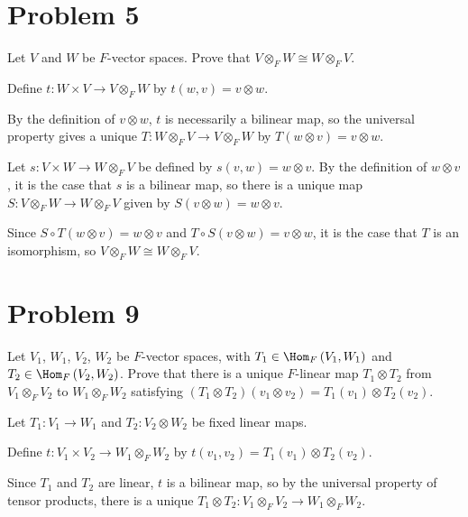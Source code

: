 \documentclass[10pt]{mypackage}
\begin{document}
\section{Problem 5}%
\begin{problem}
  Let $V$ and $W$ be $F$-vector spaces. Prove that $V\otimes_{F} W \cong W\otimes_{F} V$.
\end{problem}
\begin{solution}
  Define $t: W\times V \rightarrow V\otimes_{F} W$ by $t\left(w,v\right) = v\otimes w$.\newline

  By the definition of $v\otimes w$, $t$ is necessarily a bilinear map, so the universal property gives a unique $T: W\otimes_{F}V\rightarrow V\otimes_{F}W$ by $T\left(w\otimes v\right) = v\otimes w$.\newline

  Let $s: V\times W \rightarrow W\otimes_{F} V$ be defined by $s\left(v,w\right) = w\otimes v$. By the definition of $w\otimes v$, it is the case that $s$ is a bilinear map, so there is a unique map $S: V\otimes_{F} W \rightarrow W\otimes_{F} V$ given by $S\left(v\otimes w\right) = w\otimes v$.\newline

  Since $S\circ T\left(w\otimes v\right) = w\otimes v$ and $T\circ S\left(v\otimes w\right) = v\otimes w$, it is the case that $T$ is an isomorphism, so $V\otimes_{F} W \cong W\otimes_{F} V$.
\end{solution}
\section{Problem 9}%
\begin{problem}
  Let $V_1$, $W_1$, $V_2$, $W_2$ be $F$-vector spaces, with $T_1\in \Hom_{F}\left(V_1,W_1\right)$ and $T_2 \in \Hom_{F}\left(V_2,W_2\right)$. Prove that there is a unique $F$-linear map $T_1\otimes T_2$ from $V_1\otimes_{F}V_2$ to $W_1\otimes_{F}W_2$ satisfying $\left(T_1\otimes T_2\right)\left(v_1\otimes v_2\right) = T_1\left(v_1\right)\otimes T_2\left(v_2\right)$.
\end{problem}
\begin{solution}
  Let $T_1: V_1\rightarrow W_1$ and $T_2: V_2\otimes W_2$ be fixed linear maps.\newline

  Define $t: V_1\times V_2\rightarrow W_1\otimes_{F} W_2$ by $t\left(v_1,v_2\right) = T_1\left(v_1\right)\otimes T_2\left(v_2\right)$.\newline

  Since $T_1$ and $T_2$ are linear, $t$ is a bilinear map, so by the universal property of tensor products, there is a unique $T_1\otimes T_2: V_1\otimes_F V_2 \rightarrow W_1\otimes_F W_2$. 
\end{solution}
\end{document}
